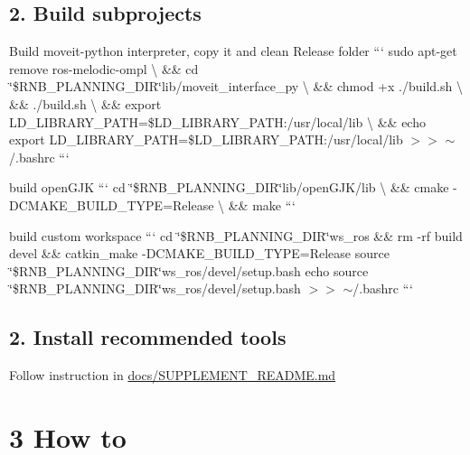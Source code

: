 \subsection*{2. Build subprojects}


\begin{DoxyItemize}
\item Build moveit-\/python interpreter, copy it and clean Release folder ``` sudo apt-\/get remove ros-\/melodic-\/ompl \textbackslash{} \&\& cd \char`\"{}\$\+R\+N\+B\+\_\+\+P\+L\+A\+N\+N\+I\+N\+G\+\_\+\+D\+I\+R\char`\"{}lib/moveit\+\_\+interface\+\_\+py \textbackslash{} \&\& chmod +x ./build.sh \textbackslash{} \&\& ./build.sh \textbackslash{} \&\& export L\+D\+\_\+\+L\+I\+B\+R\+A\+R\+Y\+\_\+\+P\+A\+TH=\$\+L\+D\+\_\+\+L\+I\+B\+R\+A\+R\+Y\+\_\+\+P\+A\+TH\+:/usr/local/lib \textbackslash{} \&\& echo \textquotesingle{}export L\+D\+\_\+\+L\+I\+B\+R\+A\+R\+Y\+\_\+\+P\+A\+TH=\$\+L\+D\+\_\+\+L\+I\+B\+R\+A\+R\+Y\+\_\+\+P\+A\+TH\+:/usr/local/lib\textquotesingle{} $>$$>$ $\sim$/.bashrc ```
\item build open\+G\+JK ``` cd \char`\"{}\$\+R\+N\+B\+\_\+\+P\+L\+A\+N\+N\+I\+N\+G\+\_\+\+D\+I\+R\char`\"{}lib/open\+G\+J\+K/lib \textbackslash{} \&\& cmake -\/\+D\+C\+M\+A\+K\+E\+\_\+\+B\+U\+I\+L\+D\+\_\+\+T\+Y\+PE=Release \textbackslash{} \&\& make ```
\item build custom workspace ``` cd \char`\"{}\$\+R\+N\+B\+\_\+\+P\+L\+A\+N\+N\+I\+N\+G\+\_\+\+D\+I\+R\char`\"{}ws\+\_\+ros \&\& rm -\/rf build devel \&\& catkin\+\_\+make -\/\+D\+C\+M\+A\+K\+E\+\_\+\+B\+U\+I\+L\+D\+\_\+\+T\+Y\+PE=Release source \char`\"{}\$\+R\+N\+B\+\_\+\+P\+L\+A\+N\+N\+I\+N\+G\+\_\+\+D\+I\+R\char`\"{}ws\+\_\+ros/devel/setup.\+bash echo \textquotesingle{}source \char`\"{}\$\+R\+N\+B\+\_\+\+P\+L\+A\+N\+N\+I\+N\+G\+\_\+\+D\+I\+R\char`\"{}ws\+\_\+ros/devel/setup.\+bash\textquotesingle{} $>$$>$ $\sim$/.bashrc ```
\end{DoxyItemize}

\subsection*{2. Install recommended tools}


\begin{DoxyItemize}
\item Follow instruction in \hyperlink{md_docs__s_u_p_p_l_e_m_e_n_t__r_e_a_d_m_e}{docs/\+S\+U\+P\+P\+L\+E\+M\+E\+N\+T\+\_\+\+R\+E\+A\+D\+ME.md}
\end{DoxyItemize}

\section*{3 How to}


